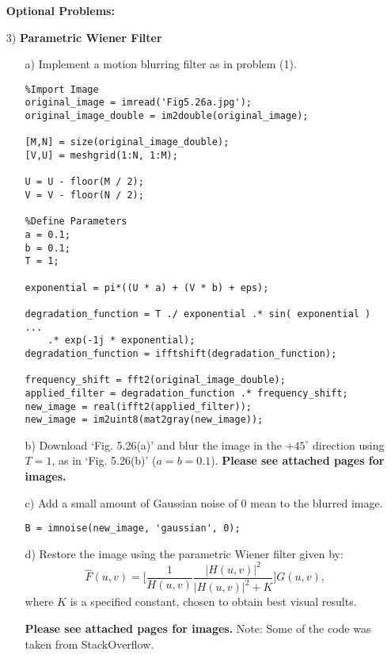 \documentclass{article}
\begin{document}
\begin{enumerate}
\begin{enumerate}
\end{enumerate}

\newpage
\textbf{Optional Problems:}

\item[3)] \textbf{Parametric Wiener Filter}
\begin{enumerate}
\item[a)] Implement a motion blurring filter as in problem (1).

\begin{lstlisting}
%Import Image
original_image = imread('Fig5.26a.jpg');
original_image_double = im2double(original_image);

[M,N] = size(original_image_double);
[V,U] = meshgrid(1:N, 1:M);

U = U - floor(M / 2);
V = V - floor(N / 2);

%Define Parameters
a = 0.1;
b = 0.1;
T = 1;

exponential = pi*((U * a) + (V * b) + eps);

degradation_function = T ./ exponential .* sin( exponential ) ...
    .* exp(-1j * exponential);
degradation_function = ifftshift(degradation_function);

frequency_shift = fft2(original_image_double);
applied_filter = degradation_function .* frequency_shift;
new_image = real(ifft2(applied_filter));
new_image = im2uint8(mat2gray(new_image));
\end{lstlisting}

\item[b)] Download `Fig. 5.26(a)' and blur the image in the $+45 ^{\circ}$ direction using $T=1$, as in `Fig. 5.26(b)' ($a = b = 0.1$).
\newline\textbf{Please see attached pages for images.}

\item[c)] Add a small amount of Gaussian noise of $0$ mean to the blurred image.

\begin{lstlisting}
B = imnoise(new_image, 'gaussian', 0);
\end{lstlisting}

\item[d)] Restore the image using the parametric Wiener filter given by:
$$\hat F(u,v)=\Big[\frac{1}{H(u,v)}\frac{|H(u,v)|^2}{|H(u,v)|^2+K}\Big]G(u,v),$$
where $K$ is a specified constant, chosen to obtain best visual results.

\textbf{Please see attached pages for images.} \newline
Note: Some of the code was taken from StackOverflow.
 

\end{enumerate}
\end{enumerate}
\end{document}
